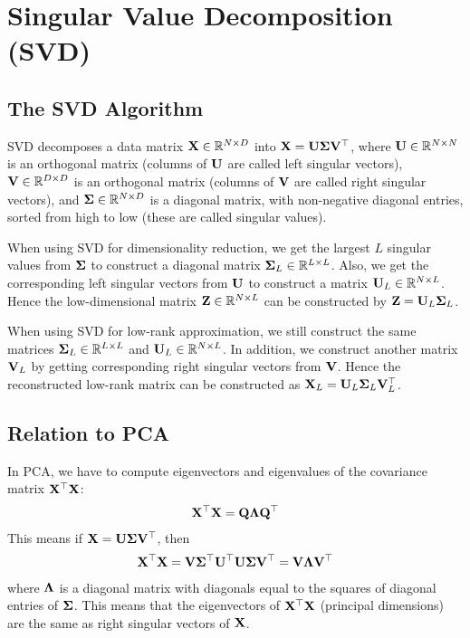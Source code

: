 \section{Singular Value Decomposition (SVD)}

\subsection{The SVD Algorithm}

SVD decomposes a data matrix $\mathbf{X}\in\mathbb{R}^{N\times D}$ into $\mathbf{X}=\mathbf{U}\mathbf{\Sigma}\mathbf{V}{}^\top$, where $\mathbf{U}\in\mathbb{R}^{N\times N}$ is an orthogonal matrix (columns of $\mathbf{U}$ are called left singular vectors), $\mathbf{V}\in\mathbb{R}^{D\times D}$ is an orthogonal matrix (columns of $\mathbf{V}$ are called right singular vectors), and $\mathbf{\Sigma}\in\mathbb{R}^{N\times D}$ is a diagonal matrix, with non-negative diagonal entries, sorted from high to low (these are called singular values).

When using SVD for dimensionality reduction, we get the largest $L$ singular values from $\mathbf{\Sigma}$ to construct a diagonal matrix $\mathbf{\Sigma}_L\in\mathbb{R}^{L\times L}$. Also, we get the corresponding left singular vectors from $\mathbf{U}$ to construct a matrix $\mathbf{U}_L\in\mathbb{R}^{N\times L}$. Hence the low-dimensional matrix $\mathbf{Z}\in\mathbb{R}^{N\times L}$ can be constructed by $\mathbf{Z}=\mathbf{U}_L\mathbf{\Sigma}_L$.

When using SVD for low-rank approximation, we still construct the same matrices $\mathbf{\Sigma}_L\in\mathbb{R}^{L\times L}$ and $\mathbf{U}_L\in\mathbb{R}^{N\times L}$. In addition, we construct another matrix $\mathbf{V}_L$ by getting corresponding right singular vectors from $\mathbf{V}$. Hence the reconstructed low-rank matrix can be constructed as $\mathbf{X}_L=\mathbf{U}_L\mathbf{\Sigma}_L\mathbf{V}_L^\top$.

\subsection{Relation to PCA}

In PCA, we have to compute eigenvectors and eigenvalues of the covariance matrix $\mathbf{X}{}^\top\mathbf{X}$:
\begin{align*}
	\mathbf{X}{}^\top\mathbf{X}=\mathbf{Q}\mathbf{\Lambda}\mathbf{Q}{}^\top
\end{align*}
This means if $\mathbf{X}=\mathbf{U}\mathbf{\Sigma}\mathbf{V}{}^\top$, then
\begin{align*}
	\mathbf{X}{}^\top\mathbf{X}=\mathbf{V}\mathbf{\Sigma}{}^\top\mathbf{U}{}^\top\mathbf{U}\mathbf{\Sigma}\mathbf{V}{}^\top=\mathbf{V}\mathbf{\Lambda}\mathbf{V}{}^\top
\end{align*}
where $\mathbf{\Lambda}$ is a diagonal matrix with diagonals equal to the squares of diagonal entries of $\mathbf{\Sigma}$. This means that the eigenvectors of $\mathbf{X}{}^\top\mathbf{X}$ (principal dimensions) are the same as right singular vectors of $\mathbf{X}$.

